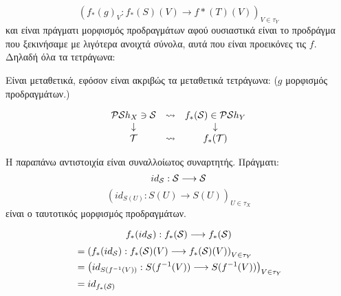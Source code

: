 $$\left(f_*(g)_V: f_*(S)(V) \longrightarrow f*(T)(V)\right)_{V\in\tau_Y}$$ και είναι πράγματι μορφισμός προδραγμάτων αφού ουσιαστικά είναι το προδράγμα που ξεκινήσαμε με λιγότερα ανοιχτά σύνολα, αυτά που είναι προεικόνες τις $f$. Δηλαδή όλα τα τετράγωνα:

\begin{figure}[H]
    \centering
\end{figure}

\noindent Είναι μεταθετικά, εφόσον είναι ακριβώς τα μεταθετικά τετράγωνα: ($g$ μορφισμός προδραγμάτων.)

\begin{figure}[H]
    \centering
\end{figure}


$$\begin{matrix} \mathcal{P}\mathcal{S} h_X \ni \mathcal{S} & \mathrel{\leadsto} & f_*(\mathcal{S}) \in \mathcal{P}\mathcal{S} h_Y\\
    \downarrow & & \downarrow \\
    \mathcal{T} & \mathrel{\leadsto} & f_*(\mathcal{T}) 
\end{matrix}$$

\noindent Η παραπάνω αντιστοιχία είναι συναλλοίωτος συναρτητής. Πράγματι:
$$id_{\mathcal{S}} : \mathcal{S} \longrightarrow \mathcal{S} $$
$$\left(id_{S(U)}: S(U) \longrightarrow S(U) \right)_{U \in \tau_X}$$ είναι ο ταυτοτικός μορφισμός προδραγμάτων.

$$f_*(id_{\mathcal{S}}): f_*(\mathcal{S}) \longrightarrow f_*(\mathcal{S})$$
\begin{align*}
&= \left( f_*(id_{\mathcal{S}}) : f_*(\mathcal{S})(V) \longrightarrow f_*(\mathcal{S})(V)\right)_{V \in \tau_Y} \\
&= \left(id_{S(f^{-1}(V))} : S(f^{-1}(V)) \longrightarrow S(f^{-1}(V)) \right)_{V \in \tau_Y} \\
&= id_{f_*(\mathcal{S})}
\end{align*}


